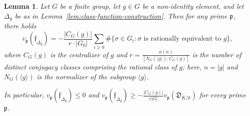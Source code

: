 \documentclass[12pt]{amsart}
\newtheorem{lemma}[theorem]{Lemma}
\theoremstyle{definition} \newtheorem{definition}[theorem]{Definition}
\theoremstyle{example} \newtheorem{example}[theorem]{Example}
\theoremstyle{remark} \newtheorem{remark}{Remark}[theorem]
\numberwithin{equation}{section}
\numberwithin{theorem}{section}
\renewcommand{\leq}{\leqslant}
\renewcommand{\geq}{\geqslant}
\begin{document}
	\begin{lemma} \label{lem:local-artin-conductor-delta}
		Let $G$ be a finite group, let $g \in G$ be a non-identity element, and let $\Delta_g$ be as in Lemma~\ref{lem:class-function-construction}.  Then for any prime $\mathfrak{p}$, there holds
			\[
				v_\mathfrak{p}(\mathfrak{f}_{\Delta_g})
					= -\frac{ |C_G(g)| }{r \cdot |G_0|} \sum_{i \geq 0} \#\{\sigma \in G_i : \sigma \text{ is rationally equivalent to $g$}\},
			\]
		where $C_G(g)$ is the centralizer of $g$ and $r = \frac{\phi(n)}{[N_G(\langle g\rangle) : C_G(g)]}$ is the number of distinct conjugacy classes comprising the rational class of $g$; here, $n=|g|$ and $N_G(\langle g \rangle)$ is the normalizer of the subgroup $\langle g \rangle$.  
		
		In particular, $v_\mathfrak{p}(\mathfrak{f}_{\Delta_g}) \leq 0$ and $v_\mathfrak{p}(\mathfrak{f}_{\Delta_g}) \geq - \frac{|C_G(g)|}{r |G|} v_\mathfrak{p}( \mathfrak{D}_{K/k})$ for every prime $\mathfrak{p}$.
	\end{lemma}
\end{document}
